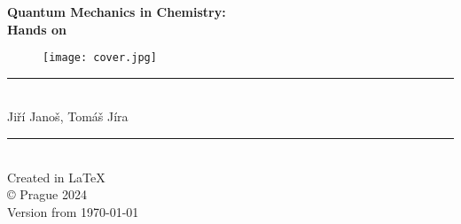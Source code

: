\begin{titlepage}
\begin{center}
\vspace*{2cm}
{\Huge \textbf{Quantum Mechanics in Chemistry:\\Hands on}}

\bigskip

\begin{figure} [H]
\centering
\texttt{[image: cover.jpg]}
\end{figure}
\rule{0.8\textwidth}{0.02cm}\\

Jiří Janoš, Tomáš Jíra\\

\end{center}
\vfill
\begin{flushright}
\rule{3cm}{0.01cm} \\
Created in \LaTeX \\
\copyright \hspace{0.1cm} Prague 2024 \\
Version from \today
\end{flushright}
\end{titlepage}